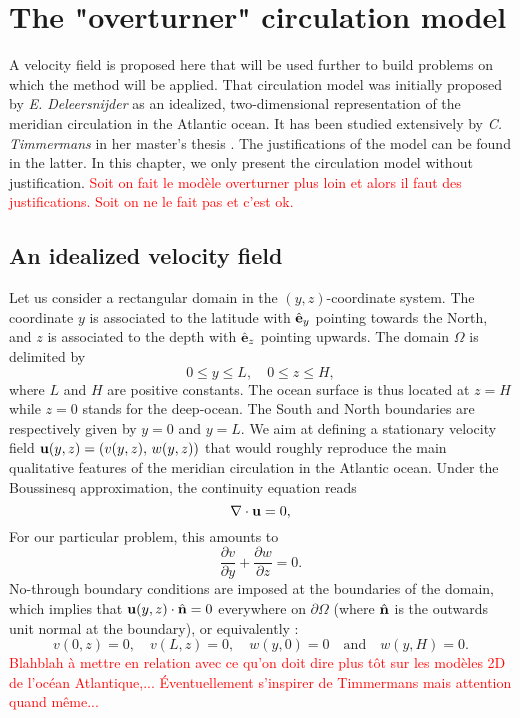 \chapter{The "overturner" circulation model} \label{chap:overturnercirculation}
A velocity field is proposed here that will be used further to build problems on which the method will be applied. That circulation model was initially proposed by \textit{E. Deleersnijder} \cite{deleersnijder2006overturner} as an idealized, two-dimensional representation of the meridian circulation in the Atlantic ocean. It has been studied extensively by \textit{C. Timmermans} in her master's thesis \cite{timmermans2006masterthesis}. The justifications of the model can be found in the latter. In this chapter, we only present the circulation model without justification. \textcolor{red}{Soit on fait le modèle overturner plus loin et alors il faut des justifications. Soit on ne le fait pas et c'est ok.}

\section{An idealized velocity field}
Let us consider a rectangular domain in the $(y,z)$-coordinate system. The coordinate $y$ is associated to the latitude with $\hat{\mathbf{e}}_y$ pointing towards the North, and $z$ is associated to the depth with $\hat{\mathbf{e}}_z$ pointing upwards. The domain $\Omega$ is delimited by
\begin{equation} 
	0 \le y \le L,\quad 0 \le z \le H,
\end{equation}
where $L$ and $H$ are positive constants. The ocean surface is thus located at $z = H$ while $z = 0$ stands for the deep-ocean. The South and North boundaries are respectively given by $y = 0$ and $y = L$. We aim at defining a stationary velocity field $\mathbf u(y,z) = (v(y,z),\, w(y,z))$ that would roughly reproduce the main qualitative features of the meridian circulation in the Atlantic ocean. Under the Boussinesq approximation, the continuity equation reads
\begin{equation} \label{eq:continuity_boussinesq}
	\nabla \cdot \mathbf u = 0,
\end{equation}
For our particular problem, this amounts to
\begin{equation}
	\frac{\partial v}{\partial y} + \frac{\partial w}{\partial z} = 0.
\end{equation}
No-through boundary conditions are imposed at the boundaries of the domain, which implies that $\mathbf u(y,z) \cdot \hat{\mathbf{n}} = 0$ everywhere on $\partial \Omega$ (where $\hat{\mathbf{n}}$ is the outwards unit normal at the boundary), or equivalently :
\begin{equation} \label{eq:overturnerBC}
	v(0,z) = 0, \quad v(L,z) = 0, \quad w(y,0) = 0 \quad \mbox{and} \quad w(y,H) = 0.
\end{equation}
\textcolor{red}{Blahblah à mettre en relation avec ce qu'on doit dire plus tôt sur les modèles 2D de l'océan Atlantique,... Éventuellement s'inspirer de Timmermans mais attention quand même...}

